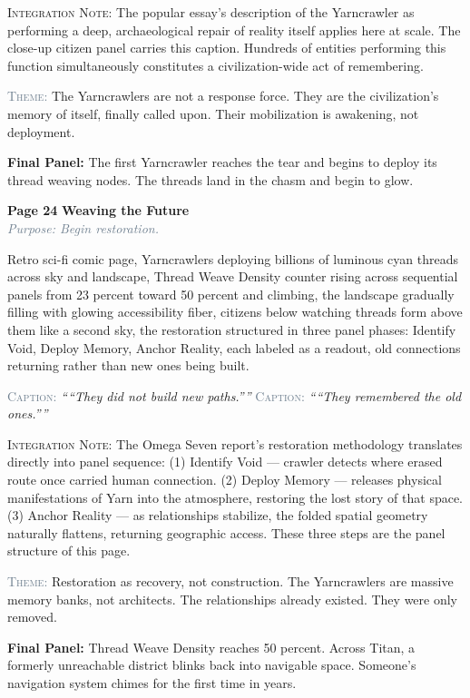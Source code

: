 \documentclass[11pt]{article}
\newcommand{\pagecaption}[1]{\medskip\noindent\textcolor{slateGray}{\textsc{Caption:}} \textit{``#1''}\medskip}
\newcommand{\cliffhanger}[1]{\medskip\noindent\textcolor{cyanThread}{\textbf{Final Panel:}} #1\medskip}
\newcommand{\prompt}[1]{\begin{terminal}{\small #1}\end{terminal}}
\newcommand{\theme}[1]{\medskip\noindent\textcolor{slateGray}{\textsc{Theme:}} #1\medskip}
\newcommand{\integration}[1]{\medskip\noindent\textcolor{archiveGold}{\textsc{Integration Note:}} #1\medskip}
\newcommand{\pageheading}[3]{%
  \begin{pagebox}
    \noindent\textbf{\textcolor{titanOrange}{Page #1}} \hfill \textbf{\textcolor{cyanThread}{#2}}\\[2pt]
    \noindent\textcolor{slateGray}{\textit{Purpose: #3}}
  \end{pagebox}
  \medskip
}
\begin{document}
\integration{The popular essay's description of the Yarncrawler as performing a deep, archaeological repair of reality itself applies here at scale. The close-up citizen panel carries this caption. Hundreds of entities performing this function simultaneously constitutes a civilization-wide act of remembering.}

\theme{The Yarncrawlers are not a response force. They are the civilization's memory of itself, finally called upon. Their mobilization is awakening, not deployment.}

\cliffhanger{The first Yarncrawler reaches the tear and begins to deploy its thread weaving nodes. The threads land in the chasm and begin to glow.}

\vspace{0.5em}

\pageheading{24}{Weaving the Future}{Begin restoration.}

\prompt{Retro sci-fi comic page, Yarncrawlers deploying billions of luminous cyan threads across sky and landscape, Thread Weave Density counter rising across sequential panels from 23 percent toward 50 percent and climbing, the landscape gradually filling with glowing accessibility fiber, citizens below watching threads form above them like a second sky, the restoration structured in three panel phases: Identify Void, Deploy Memory, Anchor Reality, each labeled as a readout, old connections returning rather than new ones being built.}

\pagecaption{``They did not build new paths.''}
\pagecaption{``They remembered the old ones.''}

\integration{The Omega Seven report's restoration methodology translates directly into panel sequence: (1) Identify Void --- crawler detects where erased route once carried human connection. (2) Deploy Memory --- releases physical manifestations of Yarn into the atmosphere, restoring the lost story of that space. (3) Anchor Reality --- as relationships stabilize, the folded spatial geometry naturally flattens, returning geographic access. These three steps are the panel structure of this page.}

\theme{Restoration as recovery, not construction. The Yarncrawlers are massive memory banks, not architects. The relationships already existed. They were only removed.}

\cliffhanger{Thread Weave Density reaches 50 percent. Across Titan, a formerly unreachable district blinks back into navigable space. Someone's navigation system chimes for the first time in years.}
\end{document}

